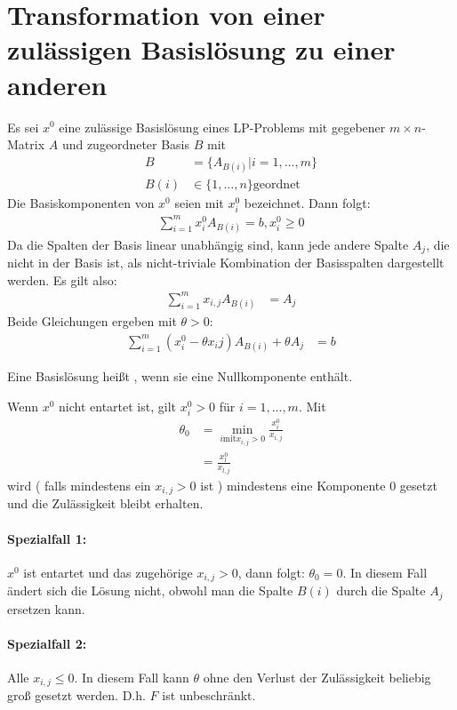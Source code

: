 \section{Transformation von einer zulässigen Basislösung zu einer anderen}
Es sei $x^0$ eine zulässige Basislösung eines LP-Problems mit gegebener $m\times n$-Matrix $A$ und zugeordneter Basis $B$ mit
\begin{align*}
B&=\{A_{B(i)} | i=1,\dotsc,m\}\\
B(i) &\in \{1,\dotsc,n\} \text{geordnet}
\end{align*}
Die Basiskomponenten von $x^0$ seien mit $x_i^0$ bezeichnet. Dann folgt:
\begin{align*}
\sum_{i=1}^m x_i^0 A_{B(i)} = b , x_i^0 \geq 0
\end{align*}
Da die Spalten der Basis linear unabhängig sind, kann jede andere Spalte $A_j$, die nicht in der Basis ist, als nicht-triviale Kombination der Basisspalten dargestellt werden. Es gilt also:
\begin{align*}
\sum_{i=1}^m x_{i,j} A_{B(i)} &= A_j
\end{align*}
Beide Gleichungen ergeben mit $\theta > 0$:
\begin{align*}
\sum_{i=1}^m ( x_i^0 - \theta x_ij ) A_{B(i)} + \theta A_j &= b
\end{align*}
\begin{definition}
Eine Basislösung heißt , wenn sie eine Nullkomponente enthält.
\end{definition}
Wenn $x^0$ nicht entartet ist, gilt $x_i^0 > 0$ für $i=1,\dotsc,m$. Mit 
\begin{align}
\theta_0 &= \min\limits_{i \text{mit} x_{i,j} > 0} \frac{x_i^0}{x_{i,j}} \\
&= \frac{x_l^0}{x_{l,j}} \label{eq:min_austausch}
\end{align}
wird ( falls mindestens ein $x_{i,j} > 0$ ist ) mindestens eine Komponente $0$ gesetzt und die Zulässigkeit bleibt erhalten.

\paragraph*{Spezialfall 1:} $x^0$ ist entartet und das zugehörige $x_{i,j} > 0$, dann folgt: $\theta_0 = 0$. In diesem Fall ändert sich die Lösung nicht, obwohl man die Spalte $B(i)$ durch die Spalte $A_j$ ersetzen kann.

\paragraph*{Spezialfall 2:} Alle $x_{i,j} \leq 0$. In diesem Fall kann $\theta$ ohne den Verlust der Zulässigkeit beliebig groß gesetzt werden. D.h. $F$ ist unbeschränkt.

